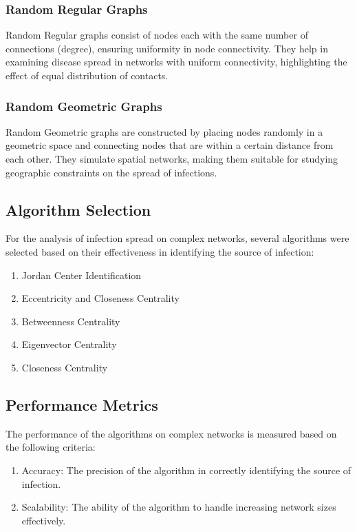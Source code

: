 \subsubsection{Random Regular Graphs}
Random Regular graphs consist of nodes each with the same number of connections (degree), ensuring uniformity in node connectivity. They help in examining disease spread in networks with uniform connectivity, highlighting the effect of equal distribution of contacts.

\subsubsection{Random Geometric Graphs}
Random Geometric graphs are constructed by placing nodes randomly in a geometric space and connecting nodes that are within a certain distance from each other. They simulate spatial networks, making them suitable for studying geographic constraints on the spread of infections.

\subsection{Algorithm Selection}
For the analysis of infection spread on complex networks, several algorithms were selected based on their effectiveness in identifying the source of infection:

\begin{enumerate}
    \item Jordan Center Identification
    \item Eccentricity and Closeness Centrality
    \item Betweenness Centrality
    \item Eigenvector Centrality
    \item Closeness Centrality
\end{enumerate}

\subsection{Performance Metrics}
The performance of the algorithms on complex networks is measured based on the following criteria:
\begin{enumerate}
    \item Accuracy: The precision of the algorithm in correctly identifying the source of infection.
    \item Scalability: The ability of the algorithm to handle increasing network sizes effectively.
\end{enumerate}


